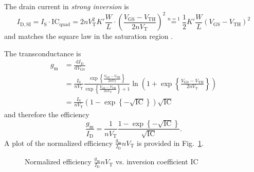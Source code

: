\documentclass{article}[11pt]
\begin{document}
The drain current in \textit{strong inversion} is
\begin{equation}\label{eq:id-si}
  I_{\mathrm{D,SI}} = I_{\mathrm{S}} \cdot \mathrm{IC}_{\mathrm{quad}}
                    = 2 n V_{\mathrm{T}}^2 K' \frac{W}{L} \cdot \left(\frac{V_{\mathrm{GS}}-V_{\mathrm{TH}}}{2 n V_{\mathrm{T}}}\right)^2
                    \stackrel{n=1}{=} \frac{1}{2} K' \frac{W}{L} \left(V_{\mathrm{GS}}-V_{\mathrm{TH}}\right)^2
\end{equation}
and matches the square law in the saturation region 
\cite{mosfet-square-law}.

\bigskip

The transconductance is
\begin{equation}\label{eq:gm}
\begin{split}
 g_{\mathrm{m}}
 &= \frac{\mathrm{d} I_{\mathrm{D}}}{\mathrm{d} V_{\mathrm{GS}}} \\
 &= \frac{I_{\mathrm{S}}}{n V_{\mathrm{T}}} \frac{\exp\left\{\frac{V_{\mathrm{GS}}-V_{\mathrm{TH}}}{2 n V_{\mathrm{T}}}\right\}}{\exp\left\{\frac{V_{\mathrm{GS}}-V_{\mathrm{TH}}}{2 n V_{\mathrm{T}}}\right\}+1} \ln\left(1+\exp\left\{\frac{V_{\mathrm{GS}}-V_{\mathrm{TH}}}{2 n V_{\mathrm{T}}}\right\}\right)\\
 &= \frac{I_{\mathrm{S}}}{n V_{\mathrm{T}}} \left(1-\exp\left\{-\sqrt{\mathrm{IC}}\right\}\right) \sqrt{\mathrm{IC}}
\end{split}
\end{equation}
and therefore the efficiency
\begin{equation}\label{eq:gmid}
\frac{g_{\mathrm{m}}}{I_{\mathrm{D}}} = \frac{1}{n V_{\mathrm{T}}}  \frac{1-\exp\left\{-\sqrt{\mathrm{IC}}\right\}}{\sqrt{\mathrm{IC}}}.
\end{equation}
A plot of the normalized efficiency $\frac{g_{\mathrm{m}}}{I_{\mathrm{D}}} n V_{\mathrm{T}}$
is provided in Fig.~\ref{fig:plot2}.
\begin{figure}[ht]
  \centering
  \caption{Normalized efficiency 
    $\frac{g_{\mathrm{m}}}{I_{\mathrm{D}}} n V_{\mathrm{T}}$ vs. 
    inversion coefficient $\mathrm{IC}$}
  \label{fig:plot2}
\end{figure}
\end{document}
